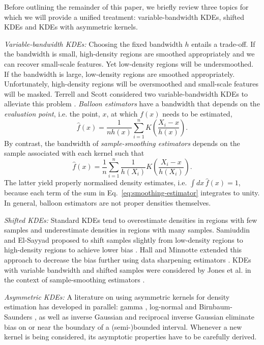 Before outlining the remainder of this paper, we briefly review three topics for which we will provide a unified treatment: variable-bandwidth KDEs, shifted KDEs and KDEs with asymmetric kernels.

\emph{Variable-bandwidth KDEs: }Choosing the fixed bandwidth $h$ entails a trade-off. If the bandwidth is small, high-density regions are smoothed appropriately and we can recover small-scale features. Yet low-density regions will be undersmoothed. If the bandwidth is large, low-density regions are smoothed appropriately. Unfortunately, high-density regions will be oversmoothed and small-scale features will be masked. Terrell and Scott considered two variable-bandwidth KDEs to alleviate this problem \cite{Terrell1992}. \emph{Balloon estimators} have a bandwidth that depends on the \emph{evaluation point}, i.e. the point, $x$, at which $f\left(x\right)$ needs to be estimated,
\begin{equation}
\hat{f}\left(x\right)=\frac{1}{nh\left(x\right)}\sum_{i=1}^{n}K\left(\frac{X_{i}-x}{h\left(x\right)}\right).\label{eq:balloon-estimator}
\end{equation}
By contrast, the bandwidth of \emph{sample-smoothing estimators} depends on the sample associated with each kernel such that
\begin{equation}
\hat{f}\left(x\right)=\frac{1}{n}\sum_{i=1}^{n}\frac{1}{h\left(X_{i}\right)}K\left(\frac{X_{i}-x}{h\left(X_{i}\right)}\right).\label{eq:smoothing-estimator}
\end{equation}
The latter yield properly normalised density estimates, i.e. $\int dx\,\hat{f}\left(x\right)=1$, because each term of the sum in Eq.~\eqref{eq:smoothing-estimator} integrates to unity. In general, balloon estimators are not proper densities themselves.

\emph{Shifted KDEs: }Standard KDEs tend to overestimate densities in regions with few samples and underestimate densities in regions with many samples. Samiuddin and El-Sayyad proposed to shift samples slightly from low-density regions to high-density regions to achieve lower bias \cite{Samuiddin1990}. Hall and Minnotte extended this approach to decrease the bias further using data sharpening estimators \cite{Hall2002a}. KDEs with variable bandwidth and shifted samples were considered by Jones et al. in the context of sample-smoothing estimators \cite{Jones1994}. 

\emph{Asymmetric KDEs:} A literature on using asymmetric kernels for density estimation has developed in parallel: gamma \cite{Chen2000}, log-normal and Birnbaum-Saunders \cite{Jin2003}, as well as inverse Gaussian and reciprocal inverse Gaussian \cite{Scaillet2004} eliminate bias on or near the boundary of a (semi-)bounded interval. Whenever a new kernel is being considered, its asymptotic properties have to be carefully derived.

